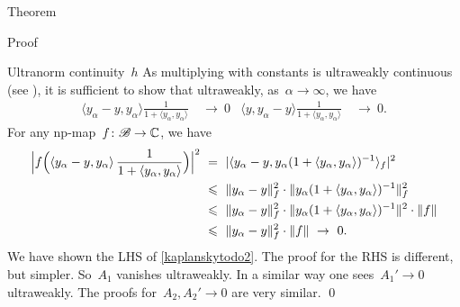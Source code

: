 \documentclass[b]{subfiles}
\begin{document}
\begin{parsec}
\begin{point}{Theorem}
\begin{point}{Proof}
\begin{point}{Ultranorm continuity~$h$}
As multiplying with
constants is ultraweakly continuous (see ),
    it is sufficient to show that ultraweakly, as~$\alpha \to \infty$, we have
\begin{align}\label{kaplanskytodo2}
    \langle y_\alpha - y, y_\alpha \rangle \frac{1}{1 + \langle y_\alpha, y_\alpha\rangle} & \ \to\  0 &
    \langle y, y_\alpha  -y\rangle \frac{1}{1 + \langle y_\alpha, y_\alpha\rangle} & \ \to \ 0.
\end{align}
For any np-map~$f\colon \mathscr{B} \to \mathbb{C}$, we have
\begin{align*}
   \Bigl| f\Bigl(\left\langle y_\alpha - y, y_\alpha \right\rangle \frac{1}{1+\langle y_\alpha, y_\alpha\rangle}\Bigr)\Bigr|^2
    & \ = \ 
    |\langle y_\alpha - y, y_\alpha (1 + \langle y_\alpha, y_\alpha  \rangle)^{-1}
    \rangle_f|^2 \\
    & \ \leq \ 
    \| y_\alpha - y \|^2_f \cdot \| y_\alpha (1 + \langle y_\alpha, y_\alpha  \rangle)^{-1} \|^2_f \\
    & \ \leq \  \|
    y_\alpha - y \|^2_f \cdot \| y_\alpha (1 + \langle y_\alpha, y_\alpha  \rangle)^{-1} \|^2 \cdot
    \|f\|
    \\
    & \ \leq \ 
    \| y_\alpha - y \|^2_f \cdot \|f\| \ \rightarrow \ 0.
\end{align*}
We have shown the LHS of \eqref{kaplanskytodo2}.
The proof for the RHS is different, but simpler.
So~$A_1$ vanishes ultraweakly.
In a similar way one sees~$A_1' \to 0$ ultraweakly.
The proofs for~$A_2, A_2' \to 0$ are very similar. \qed
\end{point}
\end{point}
\end{point}
\end{parsec}
\end{document}
